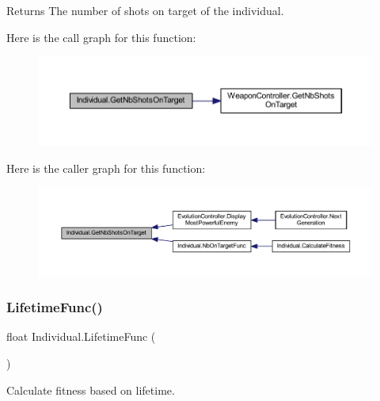 \begin{DoxyReturn}{Returns}
The number of shots on target of the individual.
\end{DoxyReturn}
Here is the call graph for this function\+:\nopagebreak
\begin{figure}[H]
\begin{center}
\leavevmode
\includegraphics[width=350pt]{class_individual_a100f431028b5b9d385348fdb000e3b32_cgraph}
\end{center}
\end{figure}
Here is the caller graph for this function\+:\nopagebreak
\begin{figure}[H]
\begin{center}
\leavevmode
\includegraphics[width=350pt]{class_individual_a100f431028b5b9d385348fdb000e3b32_icgraph}
\end{center}
\end{figure}
\mbox{\label{class_individual_af40ad69dad043da7061c07856b6f1457}} 
\subsubsection{\texorpdfstring{Lifetime\+Func()}{LifetimeFunc()}}
{\footnotesize\ttfamily float Individual.\+Lifetime\+Func (\begin{DoxyParamCaption}{ }\end{DoxyParamCaption})}



Calculate fitness based on lifetime. 

